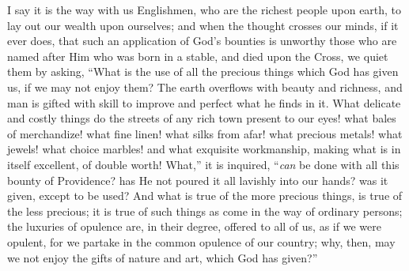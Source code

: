 I say it is the way with us Englishmen, who are the richest people
upon earth, to lay out our wealth upon ourselves; and when the thought
crosses our minds, if it ever does, that such an application of God's
bounties is unworthy those who are named after Him who was born in a
stable, and died upon the Cross, we quiet them by asking, ``What
is the use of all the precious things which God has given us, if we
may not enjoy them? The earth overflows with beauty and richness, and
man is gifted with skill to improve and perfect what he finds in it.
What delicate and costly things do the streets of any rich town
present to our eyes! what bales of merchandize! what fine linen! what
silks from afar! what precious metals! what jewels! what choice
marbles! and what exquisite workmanship, making what is in itself
excellent, of double worth! What,'' it is inquired, ``\emph{can}
be done with all this bounty of Providence? has He not poured it all
lavishly into our hands? was it given, except to be used? And what is
true of the more precious things, is true of the less precious; it is
true of such things as come in the way of ordinary persons; the
luxuries of opulence are, in their degree, offered to all of us, as if
we were opulent, for we partake in the common opulence of our country;
why, then, may we not enjoy the gifts of nature and art, which God has
given?''

